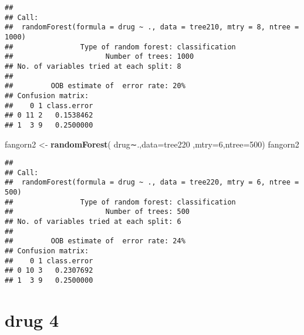 \documentclass[]{article}
\newenvironment{Shaded}{\begin{snugshade}}{\end{snugshade}}
\newcommand{\KeywordTok}[1]{\textcolor[rgb]{0.13,0.29,0.53}{\textbf{#1}}}
\newcommand{\DataTypeTok}[1]{\textcolor[rgb]{0.13,0.29,0.53}{#1}}
\newcommand{\DecValTok}[1]{\textcolor[rgb]{0.00,0.00,0.81}{#1}}
\newcommand{\StringTok}[1]{\textcolor[rgb]{0.31,0.60,0.02}{#1}}
\newcommand{\CommentTok}[1]{\textcolor[rgb]{0.56,0.35,0.01}{\textit{#1}}}
\newcommand{\OperatorTok}[1]{\textcolor[rgb]{0.81,0.36,0.00}{\textbf{#1}}}
\newcommand{\NormalTok}[1]{#1}
\begin{document}
\begin{verbatim}
## 
## Call:
##  randomForest(formula = drug ~ ., data = tree210, mtry = 8, ntree = 1000) 
##                Type of random forest: classification
##                      Number of trees: 1000
## No. of variables tried at each split: 8
## 
##         OOB estimate of  error rate: 20%
## Confusion matrix:
##    0 1 class.error
## 0 11 2   0.1538462
## 1  3 9   0.2500000
\end{verbatim}

\begin{Shaded}
\begin{Highlighting}[]
\NormalTok{fangorn2 <-}\StringTok{ }\KeywordTok{randomForest}\NormalTok{( drug∼.,}\DataTypeTok{data=}\NormalTok{tree220  ,}\DataTypeTok{mtry=}\DecValTok{6}\NormalTok{,}\DataTypeTok{ntree=}\DecValTok{500}\NormalTok{)}
\NormalTok{fangorn2}
\end{Highlighting}
\end{Shaded}

\begin{verbatim}
## 
## Call:
##  randomForest(formula = drug ~ ., data = tree220, mtry = 6, ntree = 500) 
##                Type of random forest: classification
##                      Number of trees: 500
## No. of variables tried at each split: 6
## 
##         OOB estimate of  error rate: 24%
## Confusion matrix:
##    0 1 class.error
## 0 10 3   0.2307692
## 1  3 9   0.2500000
\end{verbatim}

\section{drug 4}\label{drug-4}

\begin{Shaded}
\end{Shaded}
\end{document}
